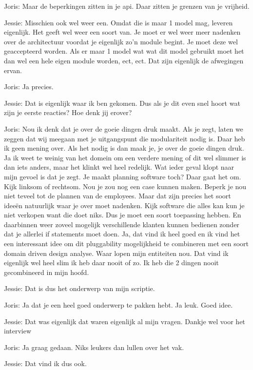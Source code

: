 Joris: Maar de beperkingen zitten in je api. Daar zitten je grenzen van je vrijheid.

Jessie: Misschien ook wel weer een. Omdat die is maar 1 model mag, leveren eigenlijk. Het geeft wel weer een soort van. Je moet er wel weer meer nadenken over de architectuur voordat je eigenlijk zo'n module begint. Je moet deze wel geaccepteerd worden. Als er maar 1 model wat wat dit model gebruikt moet het dan wel een hele eigen module worden, ect, ect. Dat zijn eigenlijk de afwegingen ervan.

Joris: Ja precies.

Jessie: Dat is eigenlijk waar ik ben gekomen. Dus als je dit even snel hoort wat zijn je eerste reacties? Hoe denk jij erover?

Joris: Nou ik denk dat je over de goeie dingen druk maakt. Als je zegt, laten we zeggen dat wij meegaan met je uitgangspunt die modulariteit nodig is. Daar heb ik geen mening over. Als het nodig is dan maak je, je over de goeie dingen druk. Ja ik weet te weinig van het domein om een verdere mening of dit wel slimmer is dan iets anders, maar het klinkt wel heel redelijk. Wat ieder geval klopt naar mijn gevoel is dat je zegt. Je maakt planning software toch? Daar gaat het om. Kijk linksom of rechtsom. Nou je zou nog een case kunnen maken. Beperk je nou niet teveel tot de plannen van de employees. Maar dat zijn precies het soort ideeën natuurlijk waar je over moet nadenken. Kijk software die alles kan kun je niet verkopen want die doet niks. Dus je moet een soort toepassing hebben. En daarbinnen weer zoveel mogelijk verschillende klanten kunnen bedienen zonder dat je allerlei if statements moet doen. Ja, dat vind ik heel goed en ik vind het een interessant idee om dit pluggability mogelijkheid te combineren met een soort domain driven design analyse. Waar lopen mijn entiteiten nou. Dat vind ik eigenlijk wel heel slim ik heb daar nooit of zo. Ik heb die 2 dingen nooit gecombineerd in mijn hoofd.

Jessie: Dat is dus het onderwerp van mijn scriptie.

Joris: Ja dat je een heel goed onderwerp te pakken hebt. Ja leuk. Goed idee.

Jessie: Dat was eigenlijk dat waren eigenlijk al mijn vragen. Dankje wel voor het interview

Joris: Ja graag gedaan. Niks leukers dan lullen over het vak.

Jessie: Dat vind ik dus ook.
